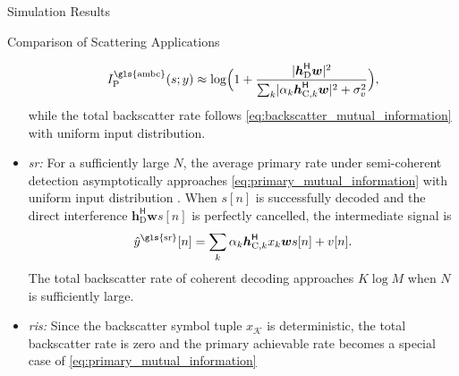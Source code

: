 \documentclass[journal]{IEEEtran}
\begin{document}
\begin{section}{Simulation Results}
\begin{subsection}{Comparison of Scattering Applications}
\begin{itemize}
			\begin{equation}
				I_{\text{P}}^{\text{\gls{ambc}}}(s;y) \approx \log \Bigl(1 + \frac{\lvert\boldsymbol{h}_{\text{D}}^\mathsf{H}\boldsymbol{w}\rvert^2}{\sum_{k}\lvert \alpha_k \boldsymbol{h}_{\text{C},k}^\mathsf{H} \boldsymbol{w}\rvert^2+\sigma_v^2}\Bigr),
			\end{equation}
			while the total backscatter rate follows \eqref{eq:backscatter_mutual_information} with uniform input distribution.
			\item \emph{\gls{sr}:} For a sufficiently large $N$, the average primary rate under semi-coherent detection asymptotically approaches \eqref{eq:primary_mutual_information} with uniform input distribution \cite{Long2020a}.
			When $s[n]$ is successfully decoded and the direct interference $\boldsymbol{h}_{\text{D}}^\mathsf{H} \boldsymbol{w} s[n]$ is perfectly cancelled, the intermediate signal is
			\begin{equation}
				\hat{y}^{\text{\gls{sr}}}[n] = \sum_{k} \alpha_k \boldsymbol{h}_{\text{C},k}^\mathsf{H} x_k \boldsymbol{w} s[n] + v[n].
				\label{eq:intermediate_signal}
			\end{equation}
			The total backscatter rate of coherent decoding approaches $K \log M$ when $N$ is sufficiently large.
			\item \emph{\gls{ris}:} Since the backscatter symbol tuple $x_{\mathcal{K}}$ is deterministic, the total backscatter rate is zero and the primary achievable rate becomes a special case of \eqref{eq:primary_mutual_information}
			\begin{equation}

\end{equation}
\end{itemize}
\end{subsection}
\end{section}
\end{document}
